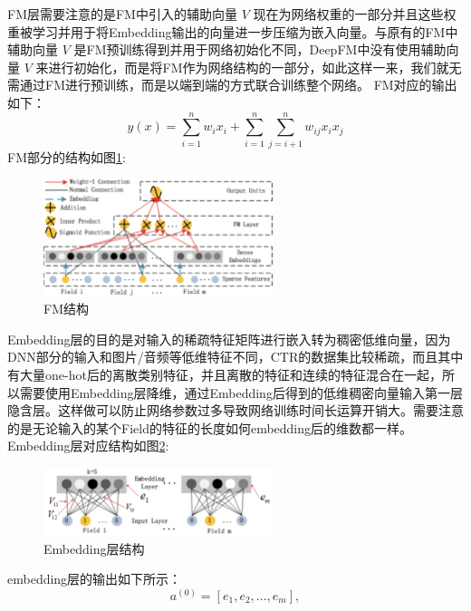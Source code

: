 FM层需要注意的是FM中引入的辅助向量 $V$ 现在为网络权重的一部分并且这些权重被学习并用于将Embedding输出的向量进一步压缩为嵌入向量。与原有的FM中辅助向量 $V$ 是FM预训练得到并用于网络初始化不同，DeepFM中没有使用辅助向量 $V$ 来进行初始化，而是将FM作为网络结构的一部分，如此这样一来，我们就无需通过FM进行预训练，而是以端到端的方式联合训练整个网络。
FM对应的输出如下：
\begin{equation}
  y(x) = \sum_{i = 1}^n w_{i}x_{i} + \sum_{i = 1}^n\sum_{j = i + 1}^n w_{ij}x_{i}x_{j}
\end{equation}
FM部分的结构如图\ref{DeepFM-FM}:
\begin{figure}[htb]
  \vspace{13pt} %
  \centering
  \includegraphics[width=0.6\textwidth]{images/DeepFM-FM.png}
  \caption{FM结构\cite{guo2017deepfm}}\label{DeepFM-FM} %
\end{figure}

Embedding层的目的是对输入的稀疏特征矩阵进行嵌入转为稠密低维向量，因为DNN部分的输入和图片/音频等低维特征不同，CTR的数据集比较稀疏，而且其中有大量one-hot后的离散类别特征，并且离散的特征和连续的特征混合在一起，所以需要使用Embedding层降维，通过Embedding后得到的低维稠密向量输入第一层隐含层。这样做可以防止网络参数过多导致网络训练时间长运算开销大。需要注意的是无论输入的某个Field的特征的长度如何embedding后的维数都一样。Embedding层对应结构如图\ref{DeepFM-Embedding}:
\begin{figure}[htb]
  \vspace{13pt} %
  \centering
  \includegraphics[width=0.6\textwidth]{images/DeepFM-Embedding.png}
  \caption{Embedding层结构\cite{guo2017deepfm}}\label{DeepFM-Embedding} %
\end{figure}

embedding层的输出如下所示：
\begin{equation}
  a^{(0)} = [e_1, e_2, ..., e_m],
\end{equation}

